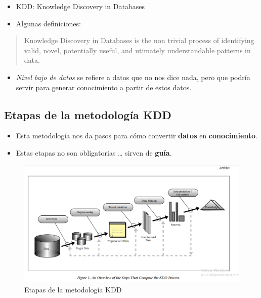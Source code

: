 \documentclass[
]{book}
\providecommand{\tightlist}{%
  \setlength{\itemsep}{0pt}\setlength{\parskip}{0pt}}
\begin{document}
\begin{itemize}
\item
  KDD: Knowledge Discovery in Databases
\item
  Algunas definiciones:
\end{itemize}

\begin{quote}
Knowledge Discovery in Databases is
the non trivial process of identifying
valid, novel, potentially useful, and
utimately understandable patterns in data.
\end{quote}

\begin{itemize}
\tightlist
\item
  \emph{Nivel bajo de datos} se refiere a datos que
  no nos dice nada, pero que podría servir para
  generar conocimiento a partir de estos datos.
\end{itemize}

\hypertarget{etapas-de-la-metodologuxeda-kdd}{%
\subsection{Etapas de la metodología KDD}\label{etapas-de-la-metodologuxeda-kdd}}

\begin{itemize}
\item
  Esta metodología nos da pasos para cómo
  convertir \textbf{datos} en \textbf{conocimiento}.
\item
  Estas etapas no son obligatorias \ldots{}
  sirven de \textbf{guía}.
\end{itemize}

\begin{figure}

{\centering \includegraphics[width=15.18in]{images/etapas-metodologia-kdd} 

}

\caption{Etapas de la metodología KDD}\label{fig:etapas-kdd}
\end{figure}
\end{document}
